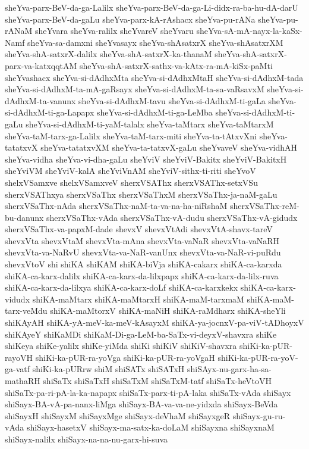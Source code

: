 {sheYva-parx-BeV-da-ga-Lalilx
sheYva-parx-BeV-da-ga-Li-didx-ra-ba-hu-dA-darU
sheYva-parx-BeV-da-gaLu
sheYva-parx-kA-rAshacx
sheYva-pu-rANa
sheYva-pu-rANaM
sheYvara
sheYva-ralilx
sheYvareV
sheYvaru
sheYva-sA-mA-nayx-la-kaSx-Namf
sheYva-sa-damxni
sheYvasayx
sheYva-shAsatxrX
sheYva-shAsatxrXM
sheYva-shA-satxrX-dalilx
sheYva-shA-satxrX-ka-thanaM
sheYva-shA-satxrX-parx-va-katxqqtAM
sheYva-shA-satxrX-sathx-va-kAtx-ra-mA-kiSx-paMti
sheYvashacx
sheYva-si-dAdhxMta
sheYva-si-dAdhxMtaH
sheYva-si-dAdhxM-tada
sheYva-si-dAdhxM-ta-mA-gaRsayx
sheYva-si-dAdhxM-ta-sa-vaRsavxM
sheYva-si-dAdhxM-ta-vanunx
sheYva-si-dAdhxM-tavu
sheYva-si-dAdhxM-ti-gaLa
sheYva-si-dAdhxM-ti-ga-Lapapx
sheYva-si-dAdhxM-ti-ga-LeMba
sheYva-si-dAdhxM-ti-gaLu
sheYva-si-dAdhxM-ti-yaM-talalx
sheYva-taMtarx
sheYva-taMtarxM
sheYva-taM-tarx-ga-Lalilx
sheYva-taM-tarx-miti
sheYva-ta-tAtxvXni
sheYva-tatatxvX
sheYva-tatatxvXM
sheYva-ta-tatxvX-gaLu
sheYvaveV
sheYva-vidhAH
sheYva-vidha
sheYva-vi-dha-gaLu
sheYviV
sheYviV-Bakitx
sheYviV-BakitxH
sheYviVM
sheYviV-kalA
sheYviVnAM
sheYviV-sithx-ti-riti
sheYvoV
shelxVSamxve
shelxVSamxveV
sherxVSAThx
sherxVSAThx-setxVSu
sherxVSAThxya
sherxVSaThx
sherxVSaThxM
sherxVSaThx-ja-naM-gaLu
sherxVSaThx-nAda
sherxVSaThx-naM-ta-va-na-ha-niRshaM
sherxVSaThx-reM-bu-danunx
sherxVSaThx-vAda
sherxVSaThx-vA-dudu
sherxVSaThx-vA-gidudx
sherxVSaThx-va-papxM-dade
shevxV
shevxVtAdi
shevxVtA-shavx-tareV
shevxVta
shevxVtaM
shevxVta-mAna
shevxVta-vaNaR
shevxVta-vaNaRH
shevxVta-va-NaRvU
shevxVta-va-NaR-vanUnx
shevxVta-va-NaR-vi-puRdu
shevxVtoV
shi
shiKA
shiKAM
shiKA-biVja
shiKA-cakarx
shiKA-ca-karxda
shiKA-ca-karx-dalilx
shiKA-ca-karx-da-lilxpapx
shiKA-ca-karx-da-lilx-ruva
shiKA-ca-karx-da-lilxya
shiKA-ca-karx-doLf
shiKA-ca-karxkekx
shiKA-ca-karx-vidudx
shiKA-maMtarx
shiKA-maMtarxH
shiKA-maM-tarxmaM
shiKA-maM-tarx-veMdu
shiKA-maMtorxV
shiKA-maNiH
shiKA-raMdharx
shiKA-sheYli
shiKAyAH
shiKA-yA-meV-ka-meV-kAsayxM
shiKA-ya-jocnxV-pa-viV-tADhoyxV
shiKAyeY
shiKaMDi
shiKaM-Di-ga-LeM-ba-SaTx-vi-deyxV-shavxra
shiKe
shiKeya
shiKe-yalilx
shiKe-yiMda
shiKi
shiKiV
shiKiV-shavxra
shiKi-ka-pUR-rayoVH
shiKi-ka-pUR-ra-yoVga
shiKi-ka-pUR-ra-yoVgaH
shiKi-ka-pUR-ra-yoV-ga-vatf
shiKi-ka-pURrw
shiM
shiSATx
shiSATxH
shiSAyx-nu-garx-ha-sa-mathaRH
shiSaTx
shiSaTxH
shiSaTxM
shiSaTxM-tatf
shiSaTx-heVtoVH
shiSaTx-pa-ri-pA-la-ka-napapx
shiSaTx-parx-ti-pA-laka
shiSaTx-vAda
shiSayx
shiSayx-BA-vA-pa-nanx-liMga
shiSayx-BA-va-va-ne-yidxda
shiSayx-BeVda
shiSayxH
shiSayxM
shiSayxMge
shiSayx-deVhaM
shiSayxgeR
shiSayx-gu-ru-vAda
shiSayx-hasetxV
shiSayx-ma-satx-ka-doLaM
shiSayxna
shiSayxnaM
shiSayx-nalilx
shiSayx-na-na-nu-garx-hi-suva
}
